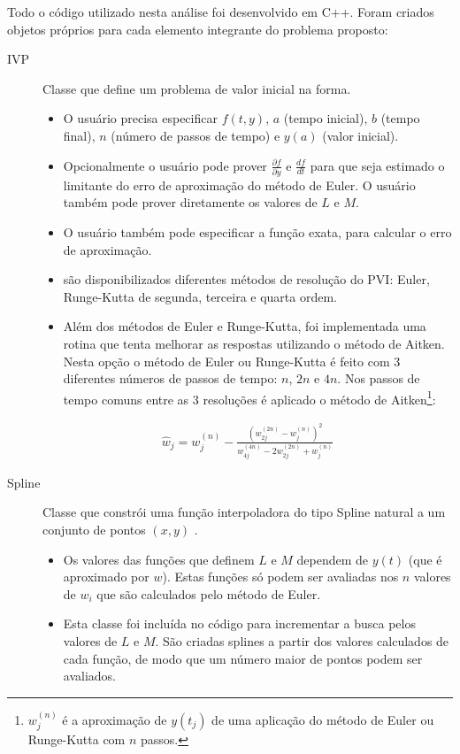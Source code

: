 \documentclass[final,5p]{elsarticle}
\numberwithin{equation}{section}
\begin{document}
        Todo o código utilizado nesta análise foi desenvolvido em C++. Foram criados objetos próprios para cada elemento integrante do problema proposto:

        \begin{description}
            \item[IVP] Classe que define um problema de valor inicial na forma.
            \begin{itemize}
                \item O usuário precisa especificar $f(t,y)$, $a$ (tempo inicial), $b$ (tempo final), $n$ (número de passos de tempo) e $y(a)$ (valor inicial).
                \item Opcionalmente o usuário pode prover $\frac{\partial f}{\partial y}$ e $\frac{df}{dt}$ para que seja estimado o limitante do erro de aproximação do método de Euler. O usuário também pode prover diretamente os valores de $L$ e $M$.
                \item O usuário também pode especificar a função exata, para calcular o erro de aproximação.
                \item são disponibilizados diferentes métodos de resolução do PVI: Euler, Runge-Kutta de segunda, terceira e quarta ordem.
                \item Além dos métodos de Euler e Runge-Kutta, foi implementada uma rotina que tenta melhorar as respostas utilizando o método de Aitken. Nesta opção o método de Euler ou Runge-Kutta é feito com 3 diferentes números de passos de tempo: $n$, $2 n$ e $4 n$. Nos passos de tempo comuns entre as 3 resoluções é aplicado o método de Aitken\footnote{$w^{(n)}_j$ é a aproximação de $y(t_j)$ de uma aplicação do método de Euler ou Runge-Kutta com $n$ passos.}:
            \end{itemize}

                \begin{align}
                    \widehat{w}_j = w^{(n)}_j - \frac{\left(w^{(2n)}_{2j} - w^{(n)}_j\right) ^2}{w^{(4n)}_{4j}-2w^{(2n)}_{2j}+w^{(n)}_j} \label{eq:aitken}
                \end{align}


            \item[Spline] Classe que constrói uma função interpoladora do tipo Spline natural a um conjunto de pontos $(x,y)$ \cite{relatoriosplinesnaturais}.
            \begin{itemize}
                \item Os valores das funções que definem $L$ e $M$ dependem de $y(t)$ (que é aproximado por $w$). Estas funções só podem ser avaliadas nos $n$ valores de $w_i$ que são calculados pelo método de Euler.
                \item Esta classe foi incluída no código para incrementar a busca pelos valores de $L$ e $M$. São criadas splines a partir dos valores calculados de cada função, de modo que um número maior de pontos podem ser avaliados.
            \end{itemize}


\end{description}
\end{document}
